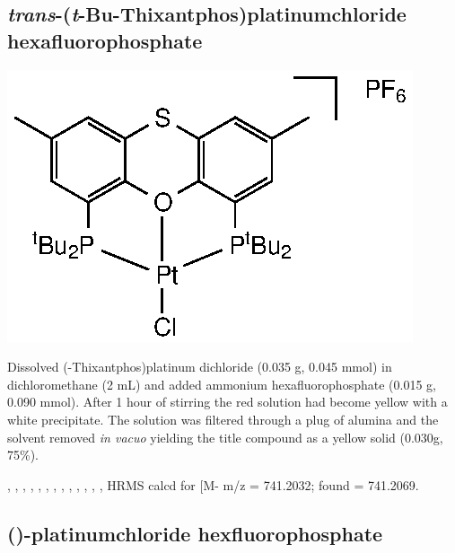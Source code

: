 \subsection*{\emph{trans}-(\emph{t}-Bu-Thixantphos)platinumchloride hexafluorophosphate}
\begin{structure}[h]
\begin{center}
\includegraphics{../Structures/StBuPtClPF6.eps}
\end{center}
\end{structure}

Dissolved (\tBu-Thixantphos)platinum dichloride (0.035 g, 0.045 mmol) in dichloromethane (2 mL) and added ammonium hexafluorophosphate (0.015 g, 0.090 mmol).  After 1 hour of stirring the red solution had become yellow with a white precipitate.  The solution was filtered through a plug of alumina and the solvent removed \emph{in vacuo} yielding the title compound as a yellow solid (0.030g, 75\%).  

,
,
,
,
,
,
,
,
,
,
,
,
,
HRMS calcd for  [M-\ce{PF6]+} m/z = 741.2032; found = 741.2069.


\subsection*{(\tBuXantphosk)-platinumchloride hexfluorophosphate}

